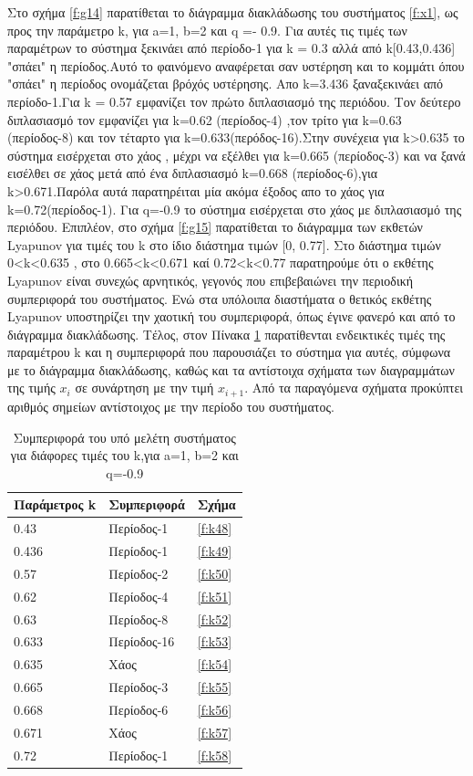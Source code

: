 Στο σχήμα \ref{f:g14} παρατίθεται το διάγραμμα διακλάδωσης του συστήματος \ref{f:x1}, ως προς την παράμετρο k, για a=1, b=2 και q =- 0.9. Για αυτές τις τιμές των παραμέτρων το σύστημα ξεκινάει από περίοδο-1 για k = 0.3 αλλά από k[0.43,0.436] "σπάει" η περίοδος.Αυτό το φαινόμενο αναφέρεται σαν υστέρηση και το κομμάτι όπου "σπάει" η περίοδος ονομάζεται βρόχός υστέρησης. Απο k=3.436 ξαναξεκινάει από περίοδο-1.Για  k = 0.57 εμφανίζει τον πρώτο διπλασιασμό της περιόδου. Τον δεύτερο διπλασιασμό τον εμφανίζει για k=0.62 (περίοδος-4) ,τον τρίτο για k=0.63 (περίοδος-8) και τον τέταρτο για k=0.633(περόδος-16).Στην συνέχεια για k>0.635 το σύστημα εισέρχεται στο χάος , μέχρι να εξέλθει  για k=0.665 (περίοδος-3) και να ξανά εισέλθει σε χάος μετά από ένα διπλασιασμό k=0.668 (περίοδος-6),για k>0.671.Παρόλα αυτά παρατηρέιται μία ακόμα έξοδος απο το χάος για k=0.72(περίοδος-1).
Για q=-0.9 το σύστημα εισέρχεται στο χάος με διπλασιασμό της περιόδου.
Επιπλέον, στο σχήμα \ref{f:g15} παρατίθεται το διάγραμμα των εκθετών Lyapunov για τιμές του k στο ίδιο διάστημα τιμών [0, 0.77].  Στο διάστημα τιμών   0<k<0.635 , στο 0.665<k<0.671 καί 0.72<k<0.77 παρατηρούμε ότι ο εκθέτης Lyapunov είναι συνεχώς αρνητικός, γεγονός που επιβεβαιώνει την περιοδική συμπεριφορά του συστήματος. Ενώ στα υπόλοιπα διαστήματα ο θετικός εκθέτης Lyapunov υποστηρίζει την χαοτική του συμπεριφορά, όπως έγινε φανερό και από το διάγραμμα διακλάδωσης.
Τέλος, στον Πίνακα \ref{tab:abc4} παρατίθενται ενδεικτικές τιμές της παραμέτρου k και η συμπεριφορά που παρουσιάζει το σύστημα για αυτές, σύμφωνα με το διάγραμμα διακλάδωσης, καθώς και τα αντίστοιχα σχήματα των διαγραμμάτων της τιμής \(x_i\) σε συνάρτηση με την τιμή \(x_{i+1}\). Από τα παραγόμενα σχήματα προκύπτει αριθμός σημείων αντίστοιχος με την περίοδο του συστήματος.

\begin{table}[h!]
	\centering
	\begin{tabular}{l | l | l}
		Παράμετρος k & Συμπεριφορά & Σχήμα\\
		\hline
		0.43 &  Περίοδος-1 & \ref{f:k48}\\
		0.436 &  Περίοδος-1 & \ref{f:k49}\\
		0.57& Περίοδος-2 & \ref{f:k50}\\
		0.62& Περίοδος-4 & \ref{f:k51}\\
		0.63 &  Περίοδος-8 & \ref{f:k52}\\
		0.633& Περίοδος-16 & \ref{f:k53}\\
		0.635& Χάος & \ref{f:k54}\\
		0.665 & Περίοδος-3 & \ref{f:k55}\\
		0.668 & Περίοδος-6 & \ref{f:k56}\\
		0.671 & Χάος & \ref{f:k57}\\
		0.72 & Περίοδος-1& \ref{f:k58}\\
	\end{tabular}
	\caption{ Συμπεριφορά του υπό μελέτη συστήματος για διάφορες τιμές του k,για a=1, b=2 και q=-0.9}
	\label{tab:abc4}
\end{table}

